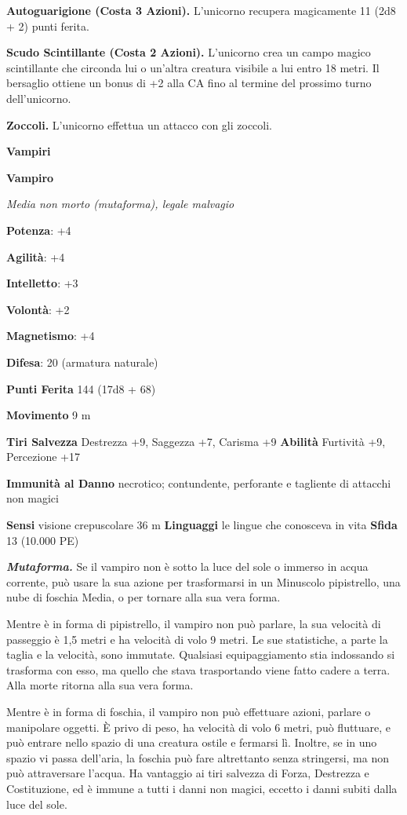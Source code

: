 \begin{multicols}{2}
\textbf{Autoguarigione (Costa 3 Azioni).} L'unicorno recupera
magicamente 11 (2d8 + 2) punti ferita.

\textbf{Scudo Scintillante (Costa 2 Azioni).} L'unicorno crea un campo
magico scintillante che circonda lui o un'altra creatura visibile a lui
entro 18 metri. Il bersaglio ottiene un bonus di +2 alla CA fino al
termine del prossimo turno dell'unicorno.

\textbf{Zoccoli.} L'unicorno effettua un attacco con gli zoccoli.

\textbf{Vampiri}

\textbf{Vampiro}

\emph{Media non morto (mutaforma), legale malvagio}

\textbf{Potenza}: +4

\textbf{Agilità}: +4

\textbf{Intelletto}: +3

\textbf{Volontà}: +2

\textbf{Magnetismo}: +4

\textbf{Difesa}: 20 (armatura naturale)

\textbf{Punti Ferita} 144 (17d8 + 68)

\textbf{Movimento} 9 m

\textbf{Tiri Salvezza} Destrezza +9, Saggezza +7, Carisma +9
\textbf{Abilità} Furtività +9, Percezione +17

\textbf{Immunità al Danno} necrotico; contundente, perforante e
tagliente di attacchi non magici

\textbf{Sensi} visione crepuscolare 36 m
\textbf{Linguaggi} le lingue che conosceva in vita \textbf{Sfida} 13
(10.000 PE)

\emph{\textbf{Mutaforma.}} Se il vampiro non è sotto la luce del sole o
immerso in acqua corrente, può usare la sua azione per trasformarsi in
un Minuscolo pipistrello, una nube di foschia Media, o per tornare alla
sua vera forma.

Mentre è in forma di pipistrello, il vampiro non può parlare, la sua
velocità di passeggio è 1,5 metri e ha velocità di volo 9 metri. Le sue
statistiche, a parte la taglia e la velocità, sono immutate. Qualsiasi
equipaggiamento stia indossando si trasforma con esso, ma quello che
stava trasportando viene fatto cadere a terra. Alla morte ritorna alla
sua vera forma.

Mentre è in forma di foschia, il vampiro non può effettuare azioni,
parlare o manipolare oggetti. È privo di peso, ha velocità di volo 6
metri, può fluttuare, e può entrare nello spazio di una creatura ostile
e fermarsi lì. Inoltre, se in uno spazio vi passa dell'aria, la foschia
può fare altrettanto senza stringersi, ma non può attraversare l'acqua.
Ha vantaggio ai tiri salvezza di Forza, Destrezza e Costituzione, ed è
immune a tutti i danni non magici, eccetto i danni subiti dalla luce del
sole.


\end{multicols}
